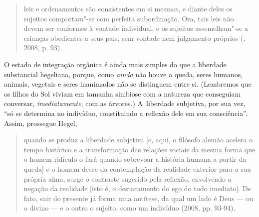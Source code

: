 \begin{quote}
leis e ordenamentos são consistentes em si mesmos, e diante deles os
sujeitos comportam"-se com perfeita subordinação. Ora, tais leis não
devem ser conformes à vontade individual, e os sujeitos assemelham"-se a
crianças obedientes a seus pais, sem vontade nem julgamento próprios
(, 2008, p. 93).
\end{quote}

O estado de integração orgânica é ainda mais simples do que a liberdade
substancial hegeliana, porque, como \emph{ainda} não houve a queda,
seres humanos, animais, vegetais e seres inanimados não se distinguem
entre si. (Lembremos que os filhos do Sol viviam em tamanha simbiose com
a natureza que conseguiam conversar, \emph{imediatamente}, com as
árvores.) A~liberdade subjetiva, por sua vez, ``só se determina no
indivíduo, constituindo a reflexão dele em sua consciência''. Assim,
prossegue Hegel,

\begin{quote}
quando se produz a liberdade subjetiva {[}e, aqui, o filósofo alemão
acelera o tempo histórico e a transformação das relações sociais da
mesma forma que o homem ridículo o fará quando sobrevoar a história
humana a partir da queda{]} e o homem desce da contemplação da realidade
exterior para a sua própria alma, surge o contraste sugerido pela
reflexão, envolvendo a negação da realidade {[}isto é, o destacamento do
ego do todo imediato{]}. De fato, sair do presente já forma uma
antítese, da qual um lado é Deus --- ou o divino --- e o outro o sujeito,
como um indivíduo (2008, pp. 93-94).
\end{quote}

